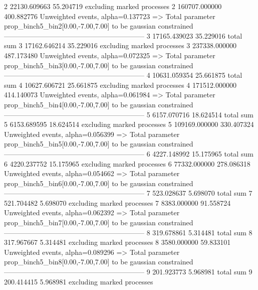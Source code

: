 2          22130.609663    55.204719       excluding marked processes    
2          160707.000000   400.882776      Unweighted events, alpha=0.137723
  => Total parameter prop_binch5_bin2[0.00,-7.00,7.00] to be gaussian constrained
------------------------------------------------------------
3          17165.439023    35.229016       total sum                     
3          17162.646214    35.229016       excluding marked processes    
3          237338.000000   487.173480      Unweighted events, alpha=0.072325
  => Total parameter prop_binch5_bin3[0.00,-7.00,7.00] to be gaussian constrained
------------------------------------------------------------
4          10631.059354    25.661875       total sum                     
4          10627.606721    25.661875       excluding marked processes    
4          171512.000000   414.140073      Unweighted events, alpha=0.061984
  => Total parameter prop_binch5_bin4[0.00,-7.00,7.00] to be gaussian constrained
------------------------------------------------------------
5          6157.070716     18.624514       total sum                     
5          6153.689595     18.624514       excluding marked processes    
5          109169.000000   330.407324      Unweighted events, alpha=0.056399
  => Total parameter prop_binch5_bin5[0.00,-7.00,7.00] to be gaussian constrained
------------------------------------------------------------
6          4227.148992     15.175965       total sum                     
6          4220.237752     15.175965       excluding marked processes    
6          77332.000000    278.086318      Unweighted events, alpha=0.054662
  => Total parameter prop_binch5_bin6[0.00,-7.00,7.00] to be gaussian constrained
------------------------------------------------------------
7          523.028637      5.698070        total sum                     
7          521.704482      5.698070        excluding marked processes    
7          8383.000000     91.558724       Unweighted events, alpha=0.062392
  => Total parameter prop_binch5_bin7[0.00,-7.00,7.00] to be gaussian constrained
------------------------------------------------------------
8          319.678861      5.314481        total sum                     
8          317.967667      5.314481        excluding marked processes    
8          3580.000000     59.833101       Unweighted events, alpha=0.089296
  => Total parameter prop_binch5_bin8[0.00,-7.00,7.00] to be gaussian constrained
------------------------------------------------------------
9          201.923773      5.968981        total sum                     
9          200.414415      5.968981        excluding marked processes    

